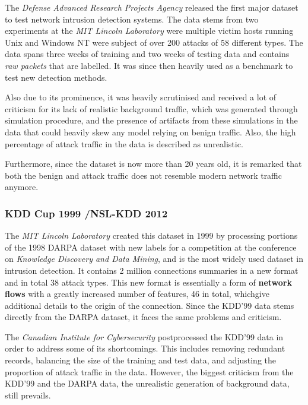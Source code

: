 \documentclass[a4paper,12pt,twoside]{report}
\begin{document}
The \textit{Defense Advanced Research Projects Agency} released the first major dataset to test network intrusion detection systems. The data stems from two experiments at the \textit{MIT Lincoln Laboratory} were multiple victim hosts running Unix and Windows NT were subject of over 200 attacks of 58 different types. The data spans three weeks of training and two weeks of testing data and contains \textit{raw packets} that are labelled. It was since then heavily used as a benchmark to test new detection methods. %

Also due to its prominence, it was heavily scrutinised and received a lot of criticism for its lack of realistic background traffic, which was generated through simulation procedure, and the presence of artifacts from these simulations in the data that could heavily skew any model relying on benign traffic. Also, the high percentage of attack traffic in the data is described as unrealistic.

Furthermore, since the dataset is now more than 20 years old, it is remarked that both the benign and attack traffic does not resemble modern network traffic anymore. 

\subsubsection*{KDD Cup 1999 \cite{cup1999data,cup1999dataset}/NSL-KDD 2012 \cite{tavallaee2012nsl}}

The \textit{MIT Lincoln Laboratory} created this dataset in 1999 by processing portions of the 1998 DARPA dataset with new labels for a competition at the conference on \textit{Knowledge Discovery and Data Mining}, and is the most widely used dataset in intrusion detection. It contains 2 million connections summaries in a new format and in total 38 attack types. This new format is essentially a form of \textbf{network flows} with a greatly increased number of features, 46 in total, whichgive additional details to the origin of the connection. Since the KDD'99 data stems directly from the DARPA dataset, it faces the same problems and criticism. 

The \textit{Canadian Institute for Cybersecurity} postprocessed the KDD'99 data in order to address some of its shortcomings. This includes removing redundant records, balancing the size of the training and test data, and adjusting the proportion of attack traffic in the data. However, the biggest criticism from the KDD'99 and the DARPA data, the unrealistic generation of background data, still prevails.
\end{document}
